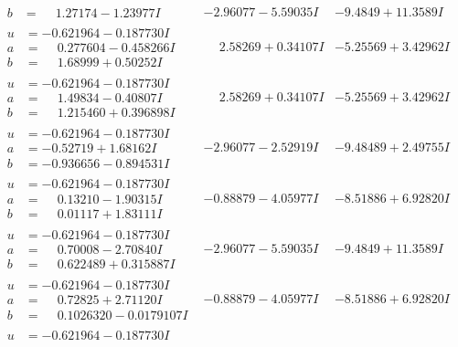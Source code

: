 \documentclass[1p]{elsarticle_modified}
\theoremstyle{definition}
\begin{document}
$$\begin{array}{c|c|c}
\begin{aligned}
b &= \phantom{-}1.27174 - 1.23977 I\end{aligned}
 & -2.96077 - 5.59035 I & -9.4849 + 11.3589 I \\ \hline\begin{aligned}
u &= -0.621964 - 0.187730 I \\
a &= \phantom{-}0.277604 - 0.458266 I \\
b &= \phantom{-}1.68999 + 0.50252 I\end{aligned}
 & \phantom{-}2.58269 + 0.34107 I & -5.25569 + 3.42962 I \\ \hline\begin{aligned}
u &= -0.621964 - 0.187730 I \\
a &= \phantom{-}1.49834 - 0.40807 I \\
b &= \phantom{-}1.215460 + 0.396898 I\end{aligned}
 & \phantom{-}2.58269 + 0.34107 I & -5.25569 + 3.42962 I \\ \hline\begin{aligned}
u &= -0.621964 - 0.187730 I \\
a &= -0.52719 + 1.68162 I \\
b &= -0.936656 - 0.894531 I\end{aligned}
 & -2.96077 - 2.52919 I & -9.48489 + 2.49755 I \\ \hline\begin{aligned}
u &= -0.621964 - 0.187730 I \\
a &= \phantom{-}0.13210 - 1.90315 I \\
b &= \phantom{-}0.01117 + 1.83111 I\end{aligned}
 & -0.88879 - 4.05977 I & -8.51886 + 6.92820 I \\ \hline\begin{aligned}
u &= -0.621964 - 0.187730 I \\
a &= \phantom{-}0.70008 - 2.70840 I \\
b &= \phantom{-}0.622489 + 0.315887 I\end{aligned}
 & -2.96077 - 5.59035 I & -9.4849 + 11.3589 I \\ \hline\begin{aligned}
u &= -0.621964 - 0.187730 I \\
a &= \phantom{-}0.72825 + 2.71120 I \\
b &= \phantom{-}0.1026320 - 0.0179107 I\end{aligned}
 & -0.88879 - 4.05977 I & -8.51886 + 6.92820 I \\ \hline\begin{aligned}
u &= -0.621964 - 0.187730 I \\

\end{aligned}
\end{array}$$
\end{document}
